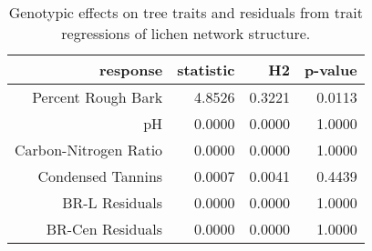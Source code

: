 \begin{table}[ht]
\centering
\begin{tabular}{rrrr}
  \hline
response & statistic & H2 & p-value \\ 
  \hline
  Percent Rough Bark & 4.8526 & 0.3221 & 0.0113 \\ 
  pH & 0.0000 & 0.0000 & 1.0000 \\ 
  Carbon-Nitrogen Ratio & 0.0000 & 0.0000 & 1.0000 \\ 
  Condensed Tannins & 0.0007 & 0.0041 & 0.4439 \\ 
  BR-L Residuals & 0.0000 & 0.0000 & 1.0000 \\ 
  BR-Cen Residuals & 0.0000 & 0.0000 & 1.0000 \\ 
   \hline
\end{tabular}
\caption{Genotypic effects on tree traits and residuals from trait regressions of lichen network structure.} 
\label{tab:h2_trait}
\end{table}
